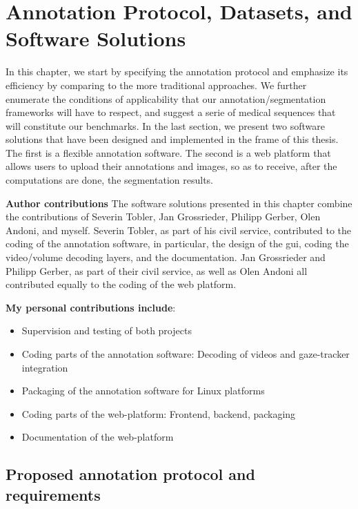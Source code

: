 \chapter{Annotation Protocol, Datasets, and Software Solutions}
\label{datasets}


In this chapter, we start by specifying the annotation protocol and emphasize its efficiency by comparing to the more traditional approaches.
We further enumerate the conditions of applicability that our annotation/segmentation frameworks will have to respect, and suggest a serie of medical sequences that will constitute our benchmarks.
In the last section, we present two software solutions that have been designed and implemented in the frame of this thesis.
The first is a flexible annotation software.
The second is a web platform that allows users to upload their annotations and images, so as to receive, after the computations are done, the segmentation results.

\textbf{Author contributions} The software solutions presented in this chapter combine the contributions of Severin Tobler, Jan Grossrieder, Philipp Gerber, Olen Andoni, and myself.
Severin Tobler, as part of his civil service, contributed to the coding of the annotation software, in particular, the design of the \gls{gui}, coding the video/volume decoding layers, and the documentation.
Jan Grossrieder and Philipp Gerber, as part of their civil service, as well as Olen Andoni all contributed equally to the coding of the web platform.

\textbf{My personal contributions include}:
\begin{itemize}
    \item Supervision and testing of both projects
    \item Coding parts of the annotation software: Decoding of videos and gaze-tracker integration
    \item Packaging of the annotation software for Linux platforms
    \item Coding parts of the web-platform: Frontend, backend, packaging
    \item Documentation of the web-platform
\end{itemize}

\section{Proposed annotation protocol and requirements}

